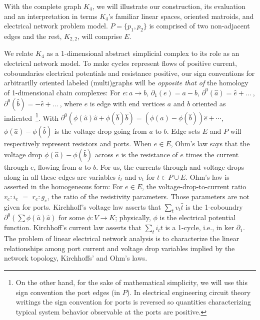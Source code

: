 With the complete graph $K_4$, we will illustrate our construction,
its evaluation and an interpretation
in terms $K_4$'s familiar linear spaces, oriented matroids, and electrical
network problem model.  $P=\{p_1, p_2\}$ is comprised of two non-adjacent
edges and the rest, $K_{2,2}$, will comprise $E$.  

We relate $K_4$ as a 1-dimensional abstract simplicial complex to
its role as an electrical network model.
To make cycles represent flows of positive current,
coboundaries electrical potentials and resistance positive,
our sign conventions for arbitrarilly oriented labeled (multi)graphs
will be \emph{opposite that of} the homology of 1-dimensional chain complexes:
For $e : a \rightarrow b$, $\partial_1(e)=a-b$, $\partial^0(\hat{a})=\hat{e}+ \ldots\  $,
$\partial^0(\hat{b})=-\hat{e}+ \ldots\  $, where $e$ is edge with end vertices $a$ and $b$ oriented
as indicated\
\footnote{
On the other hand, for the sake of mathematical simplicity,
we will use this sign convention the port edges (in $P$).
In electrical engineering
circuit theory writings the sign convention for ports is reversed
so quantities characterizing typical system behavior
observable at the ports
are positive.}.
With $\partial^0(\phi(\hat{a}) \hat{a} + \phi(\hat{b}) \hat{b}) = (\phi(\hat{a})-\phi(\hat{b}))\hat{e} + \cdots$,
$\phi(\hat{a})-\phi(\hat{b})$ is the voltage drop going from $a$ to $b$.
Edge sets $E$ and $P$ will respectively represent resistors and ports.
When $e\in E$,
Ohm's law says that
the voltage drop  $\phi(\hat{a})-\phi(\hat{b})$ across $e$ is the
resistance of $e$ 
times the current through $e$,
flowing from $a$ to $b$.
For us, the currents through and voltage drops along
in all these edges are variables $i_t$ and $v_t$ for $t\in P\cup E$.  Ohm's law
is asserted in the homogeneous form\cite{SmithElec,TutteEx,CirThProjHomo2019}:  For $e\in E$, the voltage-drop-to-current ratio
$v_e:i_e$ $=$ $r_e:g_e$, the ratio of the resistivity parameters.
Those parameters are not given for ports.
Kirchhoff's voltage law asserts that $\sum_tv_t\hat{t}$ is the 1-coboundry $\partial^0(\sum \phi(\hat{a})\hat{a})$
for some $\phi:V\rightarrow K$; physically, $\phi$ is the electrical potential function.
Kirchhoff's current law asserts that $\sum_ti_t t$ is a 1-cycle, i.e., in $\text{ker }\partial_1$. 
The problem of linear electrical network analysis is to characterize
the linear relationships among port current and voltage drop variables implied by
the network topology, Kirchhoffs' and Ohm's laws.  


